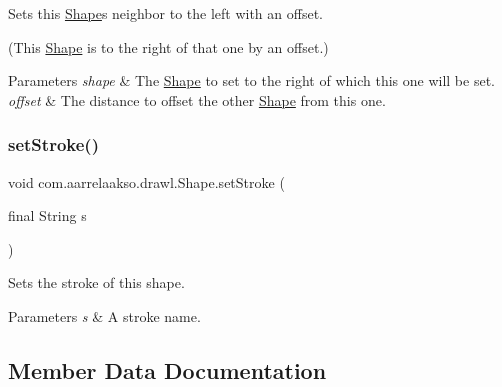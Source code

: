 Sets this \hyperlink{classcom_1_1aarrelaakso_1_1drawl_1_1_shape}{Shape}\textquotesingle{}s neighbor to the left with an offset. 

(This \hyperlink{classcom_1_1aarrelaakso_1_1drawl_1_1_shape}{Shape} is to the right of that one by an offset.)


\begin{DoxyParams}{Parameters}
{\em shape} & The \hyperlink{classcom_1_1aarrelaakso_1_1drawl_1_1_shape}{Shape} to set to the right of which this one will be set. \\
\hline
{\em offset} & The distance to offset the other \hyperlink{classcom_1_1aarrelaakso_1_1drawl_1_1_shape}{Shape} from this one. \\
\hline
\end{DoxyParams}
\mbox{\label{classcom_1_1aarrelaakso_1_1drawl_1_1_shape_a75685cbfea36858836df8e1fb4f8b821}} 
\subsubsection{\texorpdfstring{set\+Stroke()}{setStroke()}}
{\footnotesize\ttfamily void com.\+aarrelaakso.\+drawl.\+Shape.\+set\+Stroke (\begin{DoxyParamCaption}\item[{final String}]{s }\end{DoxyParamCaption})}



Sets the stroke of this shape. 


\begin{DoxyParams}{Parameters}
{\em s} & A stroke name. \\
\hline
\end{DoxyParams}


\subsection{Member Data Documentation}
\mbox{\label{classcom_1_1aarrelaakso_1_1drawl_1_1_shape_ac71780529ecfc46ae126d895d7735ac4}} 
